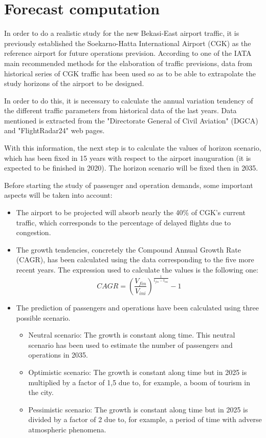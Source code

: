 \section{Forecast computation}
In order to do a realistic study for the new Bekasi-East airport traffic, it is previously established the Soekarno-Hatta International Airport (CGK) as the reference airport for future operations prevision. According to one of the IATA main recommended methods for the elaboration of traffic previsions, data from historical series of CGK traffic has been used so as to be able to extrapolate the study horizons of the airport to be designed.

In order to do this, it is necessary to calculate the annual variation tendency of the different traffic parameters from historical data of the last years. Data mentioned is extracted from the "Directorate General of Civil Aviation" (DGCA) and "FlightRadar24" web pages.

With this information, the next step is to calculate the values of horizon scenario, which has been fixed in 15 years with respect to the airport inauguration (it is expected to be finished in 2020). The horizon scenario will be fixed then in 2035.  

Before starting the study of passenger and operation demands, some important aspects will be taken into account:

\begin{itemize}
	\item The airport to be projected will absorb nearly the 40\% of CGK’s current traffic, which corresponds to the percentage of delayed flights due to congestion.
	\item The growth tendencies, concretely the Compound Annual Growth Rate (CAGR), has been calculated using the data corresponding to the five more recent years. The expression used to calculate the values is the following one:
	\begin{equation}
	CAGR=\left(\frac{V_{fin}}{V_{ini}}\right)^{\frac{1}{t_{fin}-t_{ini}}}-1
	\end{equation}
	\item The prediction of passengers and operations have been calculated using three possible scenario.
	\begin{itemize}
		\item Neutral scenario: The growth is constant along time. This neutral scenario has been used to estimate the number of passengers and operations in 2035.
		\item Optimistic scenario: The growth is constant along time but in 2025 is multiplied by a factor of 1,5 due to, for example, a boom of tourism in the city.
		\item Pessimistic scenario: The growth is constant along time but in 2025 is divided by a factor of 2 due to, for example, a period of time with adverse atmospheric phenomena.
	\end{itemize}
\end{itemize}

